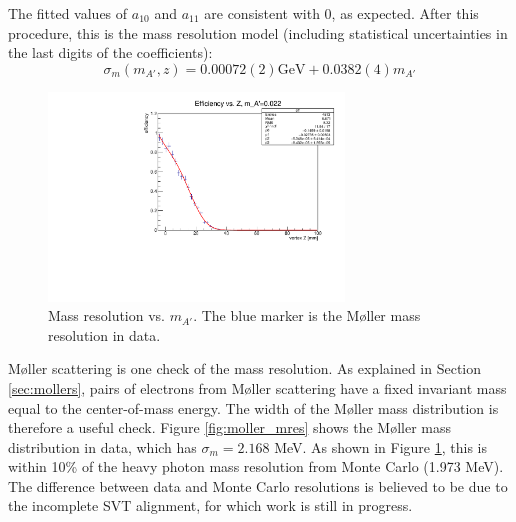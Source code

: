 The fitted values of $a_{10}$ and $a_{11}$ are consistent with 0, as expected.
After this procedure, this is the mass resolution model (including statistical uncertainties in the last digits of the coefficients):
\begin{equation}
\sigma_m(m_{A'},z) = 0.00072(2) \mathrm{GeV} + 0.0382(4) m_{A'}
\end{equation}

\begin{figure}[ht]
\begin{center}
    \includegraphics[width=0.7\textwidth,page=12,angle=-90]{vertexing/figs/acceptance_data}
\end{center}
\caption{Mass resolution vs. $m_{A'}$. The blue marker is the M{\o}ller mass resolution in data.}
    \label{fig:mres_data}
\end{figure}

M{\o}ller scattering is one check of the mass resolution.
As explained in Section \ref{sec:mollers}, pairs of electrons from M{\o}ller scattering have a fixed invariant mass equal to the center-of-mass energy.
The width of the M{\o}ller mass distribution is therefore a useful check.
Figure \ref{fig:moller_mres} shows the M{\o}ller mass distribution in data, which has $\sigma_m=2.168$ MeV.
As shown in Figure \ref{fig:mres_data}, this is within 10\% of the heavy photon mass resolution from Monte Carlo (1.973 MeV).
The difference between data and Monte Carlo resolutions is believed to be due to the incomplete SVT alignment, for which work is still in progress.


